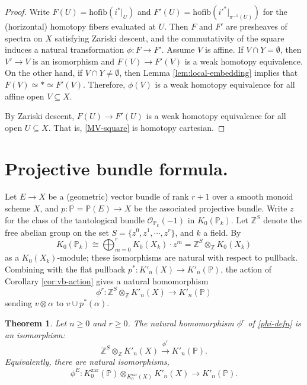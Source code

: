 \documentclass[12pt]{amsart}
\def\Kzar{K^{\mathrm{zar}}}
\newcommand{\Z}{\mathbb{Z}}
\newcommand{\bbP}{\mathbb{P}}
\numberwithin{equation}{section}
\theoremstyle{plain}
\newtheorem{thm}[equation]{Theorem}
\theoremstyle{definition}
\theoremstyle{remark}
\begin{document}
\begin{proof}
Write $F(U) = \mathrm{hofib}(i^*\vert_U)$ and $F'(U) = \mathrm{hofib}(i'^*\vert_{\pi^{-1}(U)})$ for the (horizontal) homotopy fibers evaluated at $U$. Then $F$ and $F'$ are presheaves of spectra on $X$ satisfying Zariski descent, and the commutativity of the square induces a natural transformation $\phi:F\to F'$. Assume $V$ is affine. If $V\cap Y = \emptyset$, then $V'\to V$ is an isomorphism and $F(V)\to F'(V)$ is a weak homotopy equivalence. On the other hand, if $V\cap Y\neq \emptyset$, then Lemma \ref{lem:local-embedding} implies that $F(V)\simeq \ast\simeq F'(V)$. Therefore, $\phi(V)$ is a weak homotopy equivalence for all affine open $V\subseteq X$. 

By Zariski descent, $F(U)\to F'(U)$ is a weak homotopy equivalence for all open $U\subseteq X$. That is, \eqref{MV-square} is homotopy cartesian. 
\end{proof}

\section{Projective bundle formula.}\label{sec:proj-bundle-formula}

Let $E\to X$ be a (geometric) vector bundle of rank $r+1$ over a smooth monoid scheme $X$, and $p:\bbP = \bbP(E)\to X$ be the associated projective bundle. 
Write $z$ for the class of the tautological bundle $\mathcal{O}_{\bbP_k}(-1)$ in $K_0(\bbP_k)$. 
Let $\Z^S$ denote the free abelian group on the set $S = \{z^0,z^1,\cdots, z^r\}$, and $k$ a field. By \cite[VI.1.1]{SGA6}
\[K_0(\bbP_k) \cong \bigoplus_{m=0}^r K_0(X_k)\cdot z^m  = \Z^{S}\otimes_\Z K_0(X_k)\] 
as a $K_0(X_k)$-module; these isomorphisms are natural with respect to pullback. Combining with the flat pullback $p^*: K'_n(X)\to K'_n(\bbP)$, the action of Corollary \ref{cor:vb-action} gives a natural homomorphism 
\begin{equation}\label{phi-defn}
\phi^r:\Z^{S}\otimes_\Z K'_n(X)\to K'_n(\bbP)
\end{equation}
sending $v\otimes \alpha$ to $v\cup p^*(\alpha)$.

\begin{thm}\label{thm:proj-bundle-formula}
	Let $n\geq 0$ and $r\geq 0$. The natural homomorphism $\phi^r$ of \eqref{phi-defn} is an
	 isomorphism:
	\[\Z^{S}\otimes_\Z K'_n(X)\xrightarrow{\phi^r} K'_n(\bbP).\]
	 Equivalently, 
	 there are natural isomorphisms, 
	\[\phi^E:\Kzar_0(\bbP)\otimes_{\Kzar_0(X)} K'_n(X)\to K'_n(\bbP).\]
\end{thm}
\end{document}

